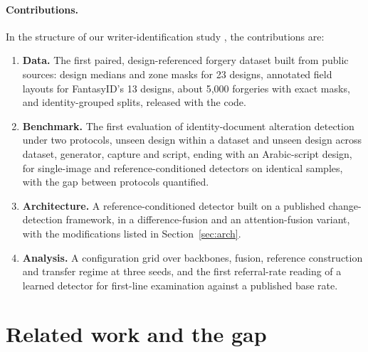\documentclass[11pt,a4paper]{article}
\begin{document}
\paragraph{Contributions.} In the structure of our writer-identification study \cite{abushahla2026ijdar}, the contributions are:
\begin{enumerate}
\item \textbf{Data.} The first paired, design-referenced forgery dataset built from public sources: design medians and zone masks for 23 designs, annotated field layouts for FantasyID's 13 designs, about 5,000 forgeries with exact masks, and identity-grouped splits, released with the code.
\item \textbf{Benchmark.} The first evaluation of identity-document alteration detection under two protocols, unseen design within a dataset and unseen design across dataset, generator, capture and script, ending with an Arabic-script design, for single-image and reference-conditioned detectors on identical samples, with the gap between protocols quantified.
\item \textbf{Architecture.} A reference-conditioned detector built on a published change-detection framework, in a difference-fusion and an attention-fusion variant, with the modifications listed in Section~\ref{sec:arch}.
\item \textbf{Analysis.} A configuration grid over backbones, fusion, reference construction and transfer regime at three seeds, and the first referral-rate reading of a learned detector for first-line examination against a published base rate.
\end{enumerate}

\FloatBarrier
\section{Related work and the gap}
\label{sec:related}
\end{document}
